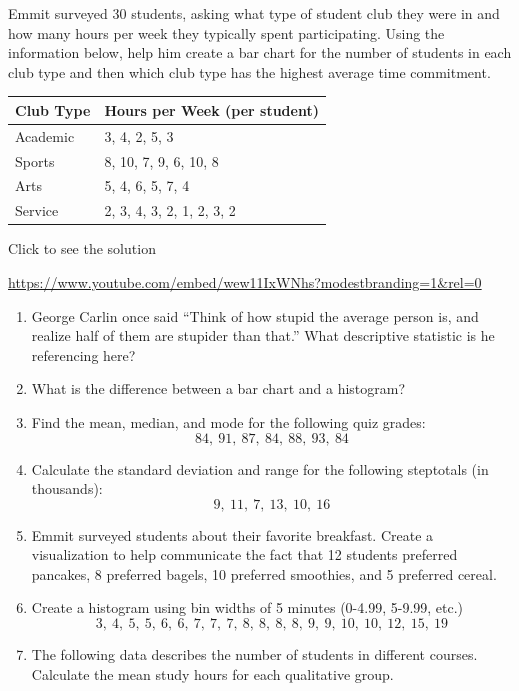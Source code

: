 \documentclass[
  letterpaper,
  DIV=11,
  numbers=noendperiod]{scrreprt}
\begin{document}
\begin{tcolorbox}[enhanced jigsaw, leftrule=.75mm, arc=.35mm, coltitle=black, rightrule=.15mm, bottomrule=.15mm, toprule=.15mm, left=2mm, colbacktitle=quarto-callout-tip-color!10!white, title=\textcolor{quarto-callout-tip-color}{\faLightbulb}\hspace{0.5em}{Try it Out}, toptitle=1mm, breakable, colframe=quarto-callout-tip-color-frame, bottomtitle=1mm, titlerule=0mm, colback=white, opacityback=0, opacitybacktitle=0.6]

Emmit surveyed 30 students, asking what type of student club they were
in and how many hours per week they typically spent participating. Using
the information below, help him create a bar chart for the number of
students in each club type and then which club type has the highest
average time commitment.

\begin{longtable}[]{@{}ll@{}}
\toprule\noalign{}
Club Type & Hours per Week (per student) \\
\midrule\noalign{}
\endhead
\bottomrule\noalign{}
\endlastfoot
Academic & 3, 4, 2, 5, 3 \\
Sports & 8, 10, 7, 9, 6, 10, 8 \\
Arts & 5, 4, 6, 5, 7, 4 \\
Service & 2, 3, 4, 3, 2, 1, 2, 3, 2 \\
\end{longtable}

Click to see the solution

\url{https://www.youtube.com/embed/wew11IxWNhs?modestbranding=1&rel=0}

\end{tcolorbox}

\begin{enumerate}
\def\labelenumi{\arabic{enumi})}
\item
  George Carlin once said ``Think of how stupid the average person is,
  and realize half of them are stupider than that.'' What descriptive
  statistic is he referencing here?
\item
  What is the difference between a bar chart and a histogram?
\item
  Find the mean, median, and mode for the following quiz grades:
  \[ 84,\ 91,\ 87,\ 84,\ 88,\ 93,\ 84\]
\item
  Calculate the standard deviation and range for the following
  steptotals (in thousands): \[9,\ 11,\ 7,\ 13,\ 10,\ 16\]
\item
  Emmit surveyed students about their favorite breakfast. Create a
  visualization to help communicate the fact that 12 students preferred
  pancakes, 8 preferred bagels, 10 preferred smoothies, and 5 preferred
  cereal.
\item
  Create a histogram using bin widths of 5 minutes (0-4.99, 5-9.99,
  etc.)
  \[3,\ 4,\ 5,\ 5,\ 6,\ 6,\ 7,\ 7,\ 7,\ 8,\ 8,\ 8,\ 8,\ 9,\ 9,\ 10,\ 10,\ 12,\ 15,\ 19\]
\item
  The following data describes the number of students in different
  courses. Calculate the mean study hours for each qualitative group.
\end{enumerate}
\end{document}
